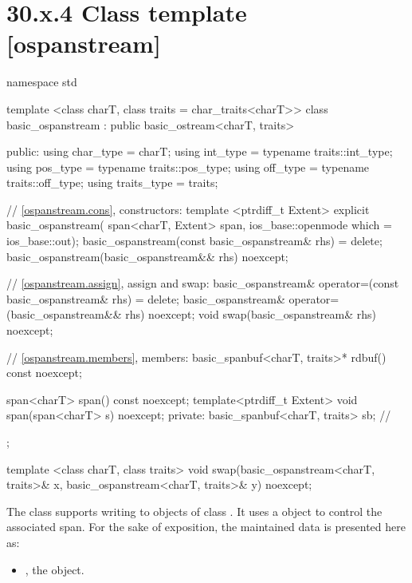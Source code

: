 \documentclass[ebook,11pt,article]{memoir}
\begin{document}
\section{30.x.4 Class template  [ospanstream] }

\begin{codeblock}
namespace std {
  template <class charT, class traits = char_traits<charT>>
  class basic_ospanstream
    : public basic_ostream<charT, traits> {
  public:
    using char_type      = charT;
    using int_type       = typename traits::int_type;
    using pos_type       = typename traits::pos_type;
    using off_type       = typename traits::off_type;
    using traits_type    = traits;

    // \ref{ospanstream.cons}, constructors:
    template <ptrdiff_t Extent>
    explicit basic_ospanstream(
      span<charT, Extent> span,
      ios_base::openmode which = ios_base::out);
    basic_ospanstream(const basic_ospanstream& rhs) = delete;
    basic_ospanstream(basic_ospanstream&& rhs) noexcept;

    // \ref{ospanstream.assign}, assign and swap:
    basic_ospanstream& operator=(const basic_ospanstream& rhs) = delete;
    basic_ospanstream& operator=(basic_ospanstream&& rhs) noexcept;
    void swap(basic_ospanstream& rhs) noexcept;

    // \ref{ospanstream.members}, members:
    basic_spanbuf<charT, traits>* rdbuf() const noexcept;

    span<charT> span() const noexcept;
	template<ptrdiff_t Extent>
    void span(span<charT> s) noexcept;
  private:
    basic_spanbuf<charT, traits> sb; // \expos
  };

  template <class charT, class traits>
    void swap(basic_ospanstream<charT, traits>& x,
              basic_ospanstream<charT, traits>& y) noexcept;
}
\end{codeblock}

\pnum
The class
supports writing to objects of class
.
It uses a
object to control the associated span.
For the sake of exposition, the maintained data is presented here as:
\begin{itemize}
\item
{}, the  object.
\end{itemize}

\end{document}
